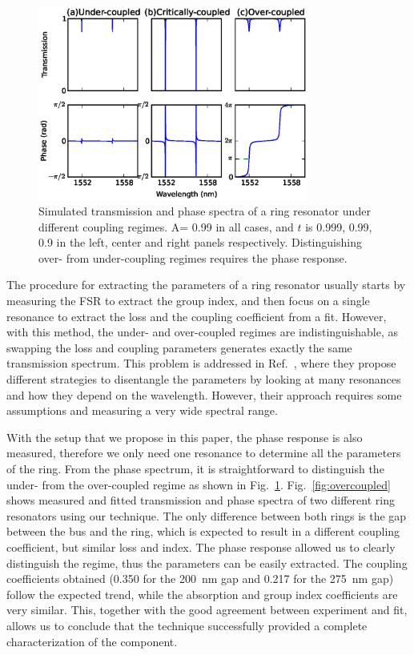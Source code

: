 \documentclass[journal]{IEEEtran}
\begin{document}
 

\begin{figure}[htb]
    \centering
    \includegraphics[width=3.5in]{ringCouplingRegimes}
    \caption{Simulated transmission and phase spectra of a ring resonator under different coupling regimes.
    A= 0.99 in all cases, and $t$ is 0.999, 0.99, 0.9 in the left, center and right panels respectively.
    Distinguishing over- from under-coupling regimes requires the phase response.}
    \label{fig:ringDifferentCoupling}
\end{figure}


The procedure for extracting the parameters of a ring resonator usually starts by measuring the FSR to extract the group index, and then focus on a single resonance to extract the loss and the coupling coefficient from a fit.
However, with this method, the under- and over-coupled regimes are indistinguishable, as swapping the loss and coupling parameters generates exactly the same transmission spectrum.
This problem is addressed in Ref.~\cite{McKinnon2009}, where they propose different strategies to disentangle the parameters by looking at many resonances and how they depend on the wavelength.
However, their approach requires some assumptions and measuring a very wide spectral range.
 
With the setup that we propose in this paper, the phase response is also measured, therefore we only need one resonance to determine all the parameters of the ring.
From the phase spectrum, it is straightforward to distinguish the under- from the over-coupled regime as shown in Fig.~\ref{fig:ringDifferentCoupling}.
Fig.~\ref{fig:overcoupled} shows measured and fitted transmission and phase spectra of two different ring resonators using our technique.
The only difference between both rings is the gap between the bus and the ring, which is expected to result in a different coupling coefficient, but similar loss and index.
The phase response allowed us to clearly distinguish the regime, thus the parameters can be easily extracted.
The coupling coefficients obtained (0.350 for the 200~nm gap and 0.217 for the 275~nm gap) follow the expected trend, while the absorption and group index coefficients are very similar.
This, together with the good agreement between experiment and fit, allows us to conclude that the technique successfully provided a complete characterization of the component.
\end{document}
